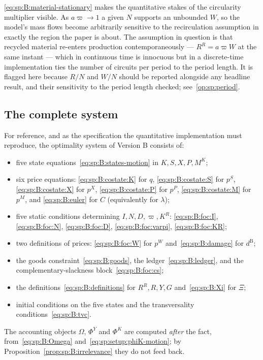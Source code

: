  \eqref{eq:sp:B:material-stationary} makes the quantitative
stakes of the circularity multiplier visible. As $a\varpi\to1$ a given $N$ supports an unbounded $W$, so
the model's mass flows become arbitrarily sensitive to the recirculation assumption in exactly the
region the paper is about. The assumption in question is that recycled material re-enters production
contemporaneously --- $R^R=a\varpi W$ at the same instant --- which in continuous time is innocuous but
in a discrete-time implementation ties the number of circuits per period to the period length. It is
flagged here because $R/N$ and $W/N$ should be reported alongside any headline result, and their
sensitivity to the period length checked; see~\ref{op:sp:period}.


\subsection{The complete system}\label{sec:sp:B:system}

For reference, and as the specification the quantitative implementation must reproduce, the optimality
system of Version B consists of:
\begin{itemize}[leftmargin=1.6em,itemsep=0.15em]
\item five state equations~\eqref{eq:sp:B:states-motion} in $K,S,X,P,M^K$;
\item six price equations: \eqref{eq:sp:B:costate:K} for $q$, \eqref{eq:sp:B:costate:S} for $p^S$,
\eqref{eq:sp:B:costate:X} for $p^X$, \eqref{eq:sp:B:costate:P} for $p^P$, \eqref{eq:sp:B:costate:M} for
$p^M$, and \eqref{eq:sp:B:euler} for $C$ (equivalently for $\lambda$);
\item five static conditions determining $I,N,D,\varpi,K^R$: \eqref{eq:sp:B:foc:I},
\eqref{eq:sp:B:foc:N}, \eqref{eq:sp:B:foc:D}, \eqref{eq:sp:B:foc:varpi}, \eqref{eq:sp:B:foc:KR};
\item two definitions of prices: \eqref{eq:sp:B:foc:W} for $p^W$ and~\eqref{eq:sp:B:damage} for $d^{\mathrm B}$;
\item the goods constraint~\eqref{eq:sp:B:goods}, the ledger~\eqref{eq:sp:B:ledger}, and the
complementary-slackness block~\eqref{eq:sp:B:foc:cs};
\item the definitions~\eqref{eq:sp:B:definitions} for $R^R,R,Y,G$ and~\eqref{eq:sp:B:Xi} for $\Xi$;
\item initial conditions on the five states and the transversality conditions~\eqref{eq:sp:B:tvc}.
\end{itemize}
The accounting objects $\Omega$, $\Phi^Y$ and $\Phi^K$ are computed \emph{after} the fact,
from~\eqref{eq:sp:B:Omega} and~\eqref{eq:sp:setup:phiK-motion}; by
Proposition~\ref{prop:sp:B:irrelevance} they do not feed back.

